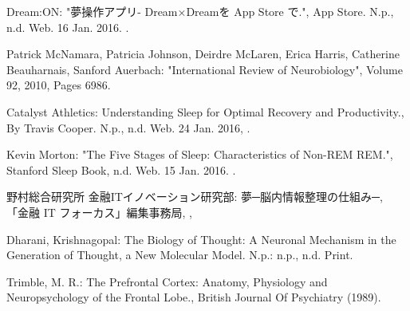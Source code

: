 \begin{bib}[100]
\begin{flushleft}
  Dream:ON:
  \newblock "夢操作アプリ- Dream×Dreamを App Store で.",
  \newblock App Store. N.p., n.d. Web. 16 Jan. 2016.
  .
\end{flushleft}

\begin{flushleft}
  Patrick McNamara, Patricia Johnson, Deirdre McLaren, Erica Harris, Catherine Beauharnais, Sanford Auerbach:
  \newblock "International Review of Neurobiology",
  \newblock Volume 92, 2010, Pages 6986.
\end{flushleft}

\begin{flushleft}
  Catalyst Athletics:
  \newblock Understanding Sleep for Optimal Recovery and Productivity.,
  \newblock By Travis Cooper. N.p., n.d. Web. 24 Jan. 2016,
  .
\end{flushleft}

\begin{flushleft}
  Kevin Morton:
  \newblock "The Five Stages of Sleep: Characteristics of Non-REM REM.",
  \newblock Stanford Sleep Book, n.d. Web. 15 Jan. 2016.
  .
\end{flushleft}

\begin{flushleft}
  野村総合研究所 金融ITイノベーション研究部:
  \newblock 夢─脳内情報整理の仕組み─,
  \newblock 「金融 IT フォーカス」編集事務局,
  ,
\end{flushleft}

\begin{flushleft}
  Dharani, Krishnagopal:
  \newblock The Biology of Thought: A Neuronal Mechanism in the Generation of Thought,
  \newblock a New Molecular Model. N.p.: n.p., n.d. Print.
\end{flushleft}

\begin{flushleft}
  Trimble, M. R.:
  \newblock The Prefrontal Cortex: Anatomy, Physiology and Neuropsychology of the Frontal Lobe.,
  \newblock  British Journal Of Psychiatry (1989).
\end{flushleft}


\end{bib}
